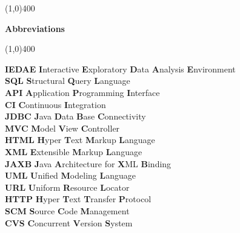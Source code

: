 \documentclass{report}
\newcommand{\Hline}{\par
  \begin{center}
   \line(1,0){400}
   \end{center}
}
\begin{document}

\newpage
\tableofcontents
\listoffigures
\listoftables

\newpage
{}
\Hline
\begin{center}{\huge\bf Abbreviations\par}\end{center}
\Hline
\vspace{10mm}
\null

\noindent
\textbf{IEDAE} \hspace{20 mm} \textbf{I}nteractive \textbf{E}xploratory \textbf{D}ata \textbf{A}nalysis \textbf{E}nvironment\\
\textbf{SQL} \hspace{25 mm} \textbf{S}tructural \textbf{Q}uery \textbf{L}anguage \\
\textbf{API} \hspace{25 mm} \textbf{A}pplication \textbf{P}rogramming \textbf{I}nterface \\
\textbf{CI} \hspace{28 mm} \textbf{C}ontinuous \textbf{I}ntegration \\
\textbf{JDBC} \hspace{22 mm} \textbf{J}ava \textbf{D}ata \textbf{B}ase \textbf{C}onnectivity \\
\textbf{MVC} \hspace{23 mm} \textbf{M}odel \textbf{V}iew \textbf{C}ontroller \\
\textbf{HTML} \hspace{20.5 mm} \textbf{H}yper \textbf{T}ext \textbf{M}arkup \textbf{L}anguage \\
\textbf{XML} \hspace{23.5 mm} \textbf{E}xtensible \textbf{M}arkup \textbf{L}anguage \\
\textbf{JAXB} \hspace{22 mm} \textbf{J}ava \textbf{A}rchitecture for \textbf{X}ML \textbf{B}inding \\
\textbf{UML} \hspace{23.5 mm} \textbf{U}nified \textbf{M}odeling \textbf{L}anguage \\
\textbf{URL} \hspace{24.5 mm} \textbf{U}niform \textbf{R}esource \textbf{L}ocator \\
\textbf{HTTP} \hspace{21.5 mm} \textbf{H}yper \textbf{T}ext \textbf{T}ransfer \textbf{P}rotocol \\
\textbf{SCM} \hspace{24.5 mm} \textbf{S}ource \textbf{C}ode \textbf{M}anagement \\
\textbf{CVS} \hspace{25 mm} \textbf{C}oncurrent \textbf{V}ersion \textbf{S}ystem \\
\end{document}
